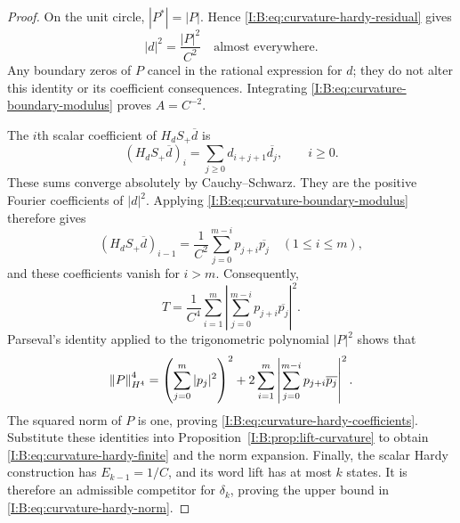 \begin{proof}
On the unit circle, $|P^*|=|P|$. Hence
\eqref{I:B:eq:curvature-hardy-residual} gives
\begin{equation}
 |d|^2=\frac{|P|^2}{C^2}\quad\text{almost everywhere}.
 \label{I:B:eq:curvature-boundary-modulus}
\end{equation}
Any boundary zeros of $P$ cancel in the rational expression for $d$;
they do not alter this identity or its coefficient consequences.
Integrating \eqref{I:B:eq:curvature-boundary-modulus} proves $A=C^{-2}$.

The $i$th scalar coefficient of $H_dS_+\overline d$ is
\begin{equation}
 (H_dS_+\overline d)_i
   =\sum_{j\ge0}d_{i+j+1}\overline{d_j},\qquad i\ge0.
 \label{I:B:eq:curvature-autocorrelation-d}
\end{equation}
These sums converge absolutely by Cauchy--Schwarz. They are the positive
Fourier coefficients of $|d|^2$. Applying
\eqref{I:B:eq:curvature-boundary-modulus} therefore gives
\[
 (H_dS_+\overline d)_{i-1}
   =\frac1{C^2}\sum_{j=0}^{m-i}p_{j+i}\overline{p_j}
 \quad(1\le i\le m),
\]
and these coefficients vanish for $i>m$. Consequently,
\begin{equation}
 T=\frac1{C^4}\sum_{i=1}^{m}
       \left|\sum_{j=0}^{m-i}p_{j+i}\overline{p_j}\right|^2.
 \label{I:B:eq:curvature-autocorrelation-P}
\end{equation}
Parseval's identity applied to the trigonometric polynomial $|P|^2$
shows that
\[
 \left\lVert P\right\rVert_{H^4}^4
 =\left(\sum_{j=0}^{m}|p_j|^2\right)^2
   +2\sum_{i=1}^{m}
       \left|\sum_{j=0}^{m-i}p_{j+i}\overline{p_j}\right|^2.
\]
The squared norm of $P$ is one, proving
\eqref{I:B:eq:curvature-hardy-coefficients}. Substitute these identities into
Proposition~\ref{I:B:prop:lift-curvature} to obtain
\eqref{I:B:eq:curvature-hardy-finite} and the norm expansion.
Finally, the scalar Hardy construction has
$E_{k-1}=1/C$, and its word lift has at most $k$ states. It is therefore
an admissible competitor for $\delta_k$, proving the upper bound in
\eqref{I:B:eq:curvature-hardy-norm}.
\end{proof}
